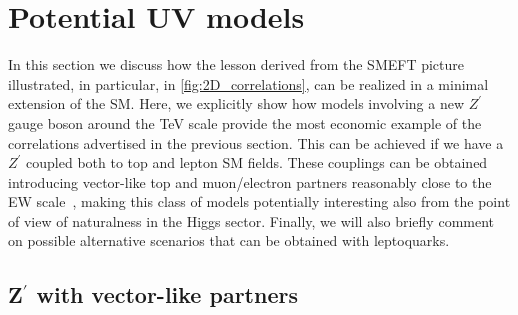 \section{Potential UV models}
\label{sec:UVtoymodels}
In this section we discuss how the lesson derived from the SMEFT picture illustrated, in particular, in \autoref{fig:2D_correlations}, can be realized in a minimal extension of the SM. Here, we explicitly show how models involving a new $Z^\prime$ gauge boson around the TeV scale provide the most economic example of the correlations advertised in the previous section. 
This can be achieved if we have a $Z^\prime$ coupled both to top and lepton SM fields.
These couplings can be obtained introducing vector-like top and muon/electron partners reasonably close to the EW scale~\cite{Kamenik:2017tnu,Fox:2018ldq}, making this class of models potentially interesting also from the point of view of naturalness in the Higgs sector.
Finally, we will also briefly comment on possible alternative scenarios that can be obtained with leptoquarks.

\subsection{\texorpdfstring{Z$^{\prime}$}{Z'} with vector-like partners}
\label{sec:mod_Zprime}

